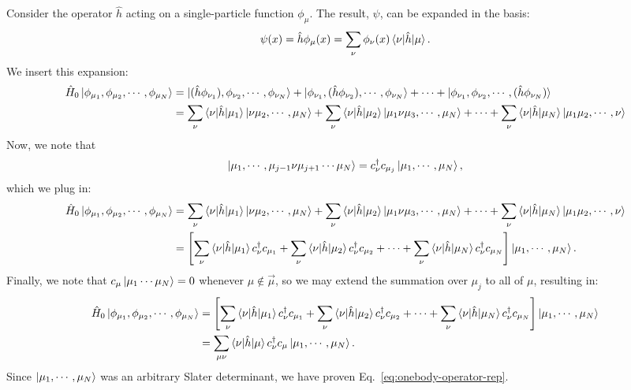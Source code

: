 \documentclass{report}
\theoremstyle{plain}
\theoremstyle{definition}
\begin{document}
Consider the operator $\hat{h}$ acting on a single-particle
function $\phi_\mu$. The result, $\psi$, can be expanded in the basis:
\begin{equation}
  \psi(x) = \hat{h}\phi_\mu(x) = \sum_\nu \phi_\nu(x)
  \braket{\nu|\hat{h}|\mu}.
\end{equation}
We insert this expansion:
\begin{equation}
  \begin{split}
    \hat{H}_0 \ket{\phi_{\mu_1}, \phi_{\mu_2}, \cdots, \phi_{\mu_N}}
    & = \ket{(\hat{h}\phi_{\nu_1}), \phi_{\nu_2},\cdots,\phi_{\nu_N}}
    + \ket{\phi_{\nu_1}, (\hat{h}\phi_{\nu_2}),\cdots,\phi_{\nu_N}} +
    \cdots +
    \ket{\phi_{\nu_1},\phi_{\nu_2},\cdots,(\hat{h}\phi_{\nu_N})} \\
    & = \sum_{\nu} \braket{\nu|\hat{h}|\mu_1}
    \ket{\nu\mu_2,\cdots,\mu_N} + 
    \sum_{\nu} \braket{\nu|\hat{h}|\mu_2}
    \ket{\mu_1\nu\mu_3,\cdots,\mu_N} + \cdots +
    \sum_{\nu} \braket{\nu|\hat{h}|\mu_N}
    \ket{\mu_1\mu_2,\cdots,\nu}
  \end{split}
\end{equation}
Now, we note that
\begin{equation}
  \ket{\mu_1,\cdots,\mu_{j-1}\nu\mu_{j+1}\cdots \mu_N} = c^\dag_\nu
  c_{\mu_j} \ket{\mu_1,\cdots,\mu_N},
\end{equation}
which we plug in:
\begin{equation}
  \begin{split}
    \hat{H}_0 \ket{\phi_{\mu_1}, \phi_{\mu_2}, \cdots, \phi_{\mu_N}} 
    & = \sum_{\nu} \braket{\nu|\hat{h}|\mu_1}
    \ket{\nu\mu_2,\cdots,\mu_N} + 
    \sum_{\nu} \braket{\nu|\hat{h}|\mu_2}
    \ket{\mu_1\nu\mu_3,\cdots,\mu_N} + \cdots +
    \sum_{\nu} \braket{\nu|\hat{h}|\mu_N}
    \ket{\mu_1\mu_2,\cdots,\nu} \\ 
    & =\left[\sum_{\nu} \braket{\nu|\hat{h}|\mu_1} c^\dag_\nu c_{\mu_1}
    + 
    \sum_{\nu} \braket{\nu|\hat{h}|\mu_2} c^\dag_\nu c_{\mu_2}
     + \cdots +
    \sum_{\nu} \braket{\nu|\hat{h}|\mu_N} c^\dag_\nu c_{\mu_N}\right]
    \ket{\mu_1,\cdots,\mu_N}.
  \end{split}
\end{equation}
Finally, we note that $c_\mu \ket{\mu_1\cdots\mu_N} = 0$ whenever
$\mu\notin\vec{\mu}$, so we may extend the summation over $\mu_j$ to
all of $\mu$, resulting in:
\begin{equation}
  \begin{split}
    \hat{H}_0 \ket{\phi_{\mu_1}, \phi_{\mu_2}, \cdots, \phi_{\mu_N}} 
    & =\left[\sum_{\nu} \braket{\nu|\hat{h}|\mu_1} c^\dag_\nu c_{\mu_1}
    + 
    \sum_{\nu} \braket{\nu|\hat{h}|\mu_2} c^\dag_\nu c_{\mu_2}
     + \cdots +
    \sum_{\nu} \braket{\nu|\hat{h}|\mu_N} c^\dag_\nu c_{\mu_N}\right]
    \ket{\mu_1,\cdots,\mu_N} \\
 & = \sum_{\mu\nu} \braket{\nu|\hat{h}|\mu} c^\dag_\nu c_\mu \ket{\mu_1,\cdots,\mu_N}.
  \end{split}
\end{equation}
Since $\ket{\mu_1,\cdots,\mu_N}$ was an arbitrary Slater determinant,
we have proven Eq.~\eqref{eq:onebody-operator-rep}.
\end{document}
